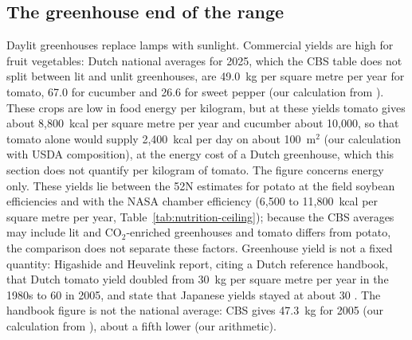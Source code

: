 \subsection{The greenhouse end of the range}\label{sec:nutrition-daylit}

Daylit greenhouses replace lamps with sunlight. Commercial yields are high for fruit vegetables: Dutch national averages for 2025, which the CBS table does not split between lit and unlit greenhouses, are 49.0~kg per square metre per year for tomato, 67.0 for cucumber and 26.6 for sweet pepper (our calculation from \cite{cbs2026groenteteelt}). These crops are low in food energy per kilogram, but at these yields tomato gives about 8{,}800~kcal per square metre per year and cucumber about 10{,}000, so that tomato alone would supply 2{,}400~kcal per day on about 100~m$^2$ (our calculation with USDA composition), at the energy cost of a Dutch greenhouse, which this section does not quantify per kilogram of tomato. The figure concerns energy only. These yields lie between the 52\textdegree{}N estimates for potato at the field soybean efficiencies and with the NASA chamber efficiency (6{,}500 to 11{,}800~kcal per square metre per year, Table~\ref{tab:nutrition-ceiling}); because the CBS averages may include lit and CO$_2$-enriched greenhouses and tomato differs from potato, the comparison does not separate these factors. Greenhouse yield is not a fixed quantity: Higashide and Heuvelink report, citing a Dutch reference handbook, that Dutch tomato yield doubled from 30~kg per square metre per year in the 1980s to 60 in 2005, and state that Japanese yields stayed at about 30 \cite[pp.~460--461]{higashide2009tomato}. The handbook figure is not the national average: CBS gives 47.3~kg for 2005 (our calculation from \cite{cbs2026groenteteelt}), about a fifth lower (our arithmetic).%

